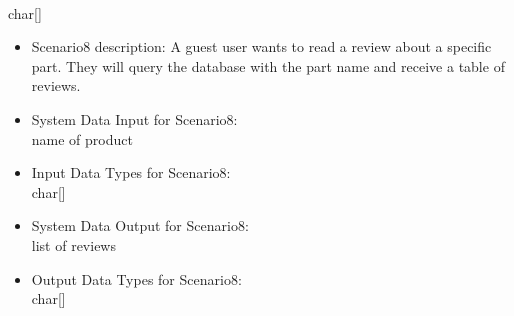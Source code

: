 {\begin{itemize}
\begin{itemize}
\begin{itemize}
	\\char[]
	\end{itemize}
	\begin{itemize} 
	\item{Scenario8 description: }
	A guest user wants to read a review about a specific part. They will query the database with the part name and receive a table of reviews.
	\item{System Data Input for Scenario8: }
	\\name of product
	\item{Input Data Types for Scenario8: }
	\\char[]
	\item{System Data Output for Scenario8: }
	\\list of reviews
	\item{Output Data Types for Scenario8: }
	\\char[]
	\end{itemize}
	\end{itemize}
\end{itemize}
}
